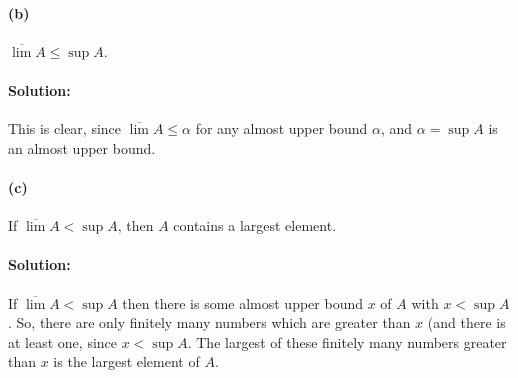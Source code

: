 \documentclass{article}
\begin{document}
\paragraph{(b)} $\overline{\lim} A \leq \sup A$.

\paragraph{Solution:} This is clear, since $\overline{\lim} A \leq \alpha$ for
any almost upper bound $\alpha$, and $\alpha = \sup A$ is an almost upper
bound.

\paragraph{(c)} If $\overline{\lim} A < \sup A$, then $A$ contains a largest
element.

\paragraph{Solution:} If $\overline{\lim} A < \sup A$ then there is some
almost upper bound $x$ of $A$ with $x < \sup A$. So, there are only finitely
many numbers which are greater than $x$ (and there is at least one, since $x <
\sup A$. The largest of these finitely many numbers greater than $x$ is the
largest element of $A$.
\end{document}
